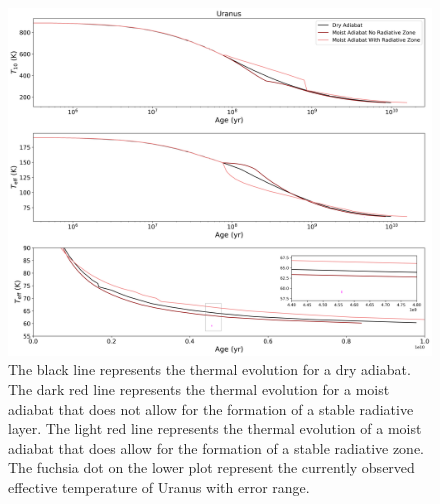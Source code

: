 \documentclass[11pt]{ucscthesisbs}
\begin{document}
\begin{figure}[ht]
 \centerline{
  \includegraphics[scale=0.5]{figures/dry_moist_radiative_u_cooling_curves_adiabat_comparisons.png}
 }
\caption[Thermal Evolution Curves for Uranus - Adiabat Comparisons]
{The black line represents the thermal evolution for a dry adiabat. The dark red line represents the thermal evolution for a moist adiabat that does not allow for the formation of a stable radiative layer. The light red line represents the thermal evolution of a moist adiabat that does allow for the formation of a stable radiative zone. The fuchsia dot on the lower plot represent the currently observed effective temperature of Uranus with error range. }
\label{fig:evolve_adiabats}
\end{figure}
\end{document}
